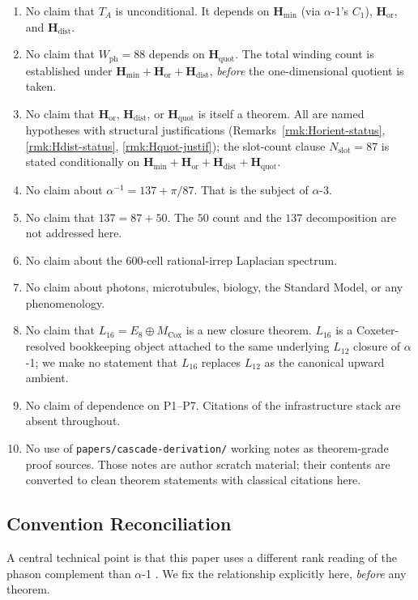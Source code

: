 \documentclass[11pt, a4paper]{amsart}
\theoremstyle{definition}
\newcommand{\Hmin}{\mathbf{H}_{\min}}
\newcommand{\Hor}{\mathbf{H}_{\mathrm{or}}}
\newcommand{\Hdist}{\mathbf{H}_{\mathrm{dist}}}
\newcommand{\Hquot}{\mathbf{H}_{\mathrm{quot}}}
\newcommand{\Mcox}{M_{\mathrm{Cox}}}
\newcommand{\Wph}{W_{\mathrm{ph}}}
\newcommand{\Nslot}{N_{\mathrm{slot}}}
\begin{document}
\begin{enumerate}
\item No claim that $T_A$ is unconditional. It depends on
  $\Hmin$ (via $\alpha$-1's $C_1$), $\Hor$, and $\Hdist$.
\item No claim that $\Wph = 88$ depends on $\Hquot$. The
  total winding count is established under $\Hmin + \Hor +
  \Hdist$, \emph{before} the one-dimensional quotient is
  taken.
\item No claim that $\Hor$, $\Hdist$, or $\Hquot$ is
  itself a theorem. All are named hypotheses with structural
  justifications (Remarks~\ref{rmk:Horient-status},
  \ref{rmk:Hdist-status}, \ref{rmk:Hquot-justif}); the
  slot-count clause $\Nslot = 87$ is stated conditionally on
  $\Hmin + \Hor + \Hdist + \Hquot$.
\item No claim about $\alpha^{-1} = 137 + \pi/87$. That is the
  subject of $\alpha$-3.
\item No claim that $137 = 87 + 50$. The $50$ count and the
  $137$ decomposition are not addressed here.
\item No claim about the $600$-cell rational-irrep Laplacian
  spectrum.
\item No claim about photons, microtubules, biology, the
  Standard Model, or any phenomenology.
\item No claim that $L_{16} = E_8 \oplus \Mcox$ is a new closure
  theorem. $L_{16}$ is a Coxeter-resolved bookkeeping object
  attached to the same underlying $L_{12}$ closure of
  $\alpha$-1; we make no statement that $L_{16}$ replaces
  $L_{12}$ as the canonical upward ambient.
\item No claim of dependence on P1--P7. Citations of the
  infrastructure stack are absent throughout.
\item No use of \texttt{papers/cascade-derivation/} working
  notes as theorem-grade proof sources. Those notes are author
  scratch material; their contents are converted to clean
  theorem statements with classical citations here.
\end{enumerate}

\subsection{Convention Reconciliation}
\label{sec:conv-recon}

A central technical point is that this paper uses a different
rank reading of the phason complement than $\alpha$-1
\cite{Cascade12D}. We fix the relationship explicitly here,
\emph{before} any theorem.
\end{document}
